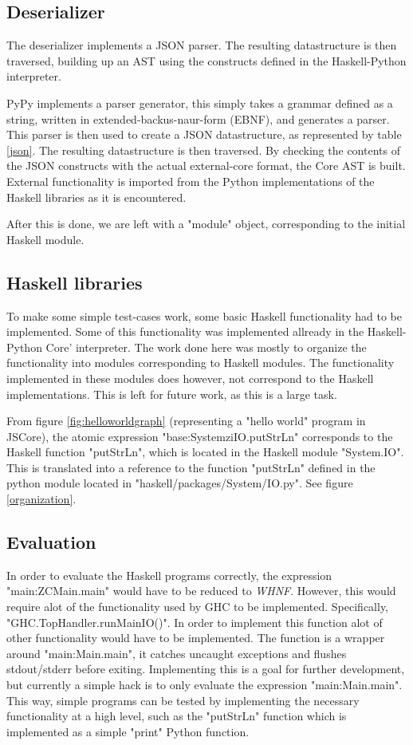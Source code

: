 \subsection{Deserializer}

The deserializer implements a JSON parser. The resulting datastructure is then traversed, building up
an AST using the constructs defined in the Haskell-Python interpreter. 

PyPy implements a parser generator, this simply takes a grammar defined as a string, written in
extended-backus-naur-form (EBNF), and generates a parser. This parser is then used to create a 
JSON datastructure, as represented by table \ref{json}.
The resulting datastructure is then traversed. By checking the contents of the JSON constructs
with the actual external-core format, the Core AST is built. External functionality is imported
from the Python implementations of the Haskell libraries as it is encountered. 

After this is done, we are left with a "module" object, corresponding to the initial Haskell
module. 

\subsection{Haskell libraries}

To make some simple test-cases work, some basic Haskell functionality had to be implemented.
Some of this functionality was implemented allready in the Haskell-Python Core' interpreter.
The work done here was mostly to organize the functionality into modules corresponding
to Haskell modules. The functionality implemented in these modules does however, not correspond
to the Haskell implementations. This is left for future work, as this is a large task.

From figure \ref{fig:helloworldgraph} (representing a "hello world" program in JSCore), the atomic 
expression "base:SystemziIO.putStrLn" corresponds
to the Haskell function "putStrLn", which is located in the Haskell module "System.IO". This is translated
into a reference to the function "putStrLn" defined in the python module located in 
"haskell/packages/System/IO.py". See figure \ref{organization}.

\subsection{Evaluation}

In order to evaluate the Haskell programs correctly, the expression "main:ZCMain.main" would have
to be reduced to \emph{WHNF}. However, this would require alot of the functionality used by GHC
to be implemented. Specifically, "GHC.TopHandler.runMainIO()". In order to implement this function
alot of other functionality would have to be implemented. The function is a wrapper around 
"main:Main.main", it catches uncaught exceptions and flushes stdout/stderr before exiting. 
Implementing this is a goal for further
development, but currently a simple hack is to only evaluate the expression "main:Main.main". This way,
simple programs can be tested by implementing the necessary functionality at a high level, such as the
"putStrLn" function which is implemented as a simple "print" Python function.

